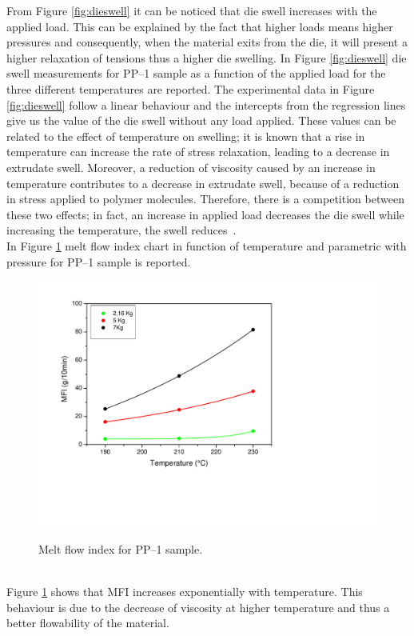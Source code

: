 \documentclass[a4paper, 11pt]{article}
\begin{document}
From Figure \ref{fig:dieswell} it can be noticed that die swell increases with the applied load. This can be explained by the fact that higher loads means higher pressures and consequently, when the material exits from the die, it will present a higher relaxation of tensions thus a higher die swelling. 
In Figure \ref{fig:dieswell} die swell measurements for PP–1 sample as a function of the applied load for the three different temperatures are reported.
The experimental data in Figure \ref{fig:dieswell} follow a linear behaviour and the intercepts from the regression lines give us the value of the die swell without any load applied. These values can be related to the effect of temperature on swelling; it is known that a rise in temperature can increase the rate of stress relaxation, leading to a decrease in extrudate swell. Moreover, a reduction of viscosity caused by an increase in temperature contributes to a decrease in extrudate swell, because of a reduction in stress applied to polymer molecules. 
Therefore, there is a competition between these two effects; in fact, an increase in applied load decreases the die swell while increasing the temperature, the swell reduces~\cite{article}.  \\
In Figure \ref{fig:mfi} melt flow index chart in function of temperature and parametric with pressure for PP–1 sample is reported.
\begin{figure}[h!]
	\centering
	{\includegraphics[scale=0.4]{mfi}}
	\captionsetup{justification=centering}
	\caption{Melt flow index for PP–1 sample.}
	\label{fig:mfi}
\end{figure}\\
Figure \ref{fig:mfi} shows that MFI increases exponentially with temperature. This behaviour is due to the decrease of viscosity at higher temperature and thus a better flowability of the material.\\
\end{document}
